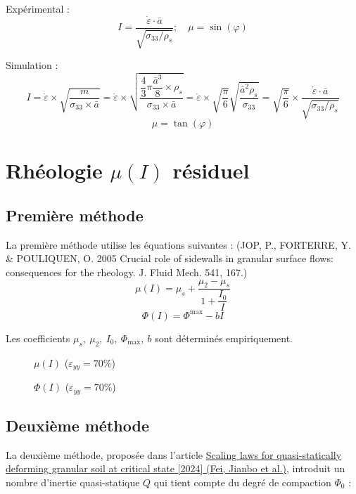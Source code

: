 \documentclass[a4paper,12pt]{report}
\begin{document}
Expérimental : 
\[
I =  \dfrac{\dot{\varepsilon} \cdot \bar{a}}{\sqrt{\sigma_{33}/\rho_s}}; \quad \mu = \sin(\varphi)
\]

Simulation : 
\[
I = \dot{\varepsilon} \times \sqrt {\dfrac{m}{\sigma_{33}\times \bar{a}}}  
= \dot{\varepsilon} \times \sqrt {\dfrac{\dfrac{4}{3} \pi \dfrac{\bar{a}^3}{8} \times \rho_s}{\sigma_{33}\times \bar{a}}} 
= \dot{\varepsilon} \times \sqrt{\dfrac{\pi}{6}} \sqrt {\dfrac{\bar{a}^2 \rho_s}{\sigma_{33}}} 
= \boxed{\sqrt{\dfrac{\pi}{6}}} \times \dfrac{\dot{\varepsilon} \cdot \bar{a}}{\sqrt{\sigma_{33}/\rho_s}}
\]
\[
\mu = \tan(\varphi)
\]

\section{Rhéologie $\mu(I)$ résiduel}

\subsection{Première méthode}

La première méthode utilise les équations suivantes : (JOP, P., FORTERRE, Y. & POULIQUEN, O. 2005 Crucial role of sidewalls in granular surface flows:
consequences for the rheology. J. Fluid Mech. 541, 167.)
\[
\mu(I) = \mu_s + \dfrac{\mu_2 - \mu_s}{1 + \dfrac{I_0}{I}}
\]
\[
\Phi(I) = \Phi^{\max} - bI
\]

Les coefficients $\mu_s,\ \mu_2,\ I_0,\ \Phi_{\max},\ b$ sont déterminés empiriquement.

\begin{figure}
    \centering
    {\small
        
    }
    \caption{$\mu(I)$ ($\varepsilon_{yy} = 70\%$)}
\end{figure}

\begin{figure}
    \centering
    {\small
        
    }
    \caption{$\Phi(I)$ ($\varepsilon_{yy} = 70\%$)}
\end{figure}

\subsection{Deuxième méthode}

La deuxième méthode, proposée dans l'article 
\href{https://link-springer-com.sid2nomade-1.grenet.fr/article/10.1007/s10035-024-01459-7}{Scaling laws for quasi-statically deforming granular soil at critical state [2024] (Fei, Jianbo et al.)}, 
introduit un nombre d'inertie quasi-statique $Q$ qui tient compte du degré de compaction $\Phi_0$ :
\end{document}
